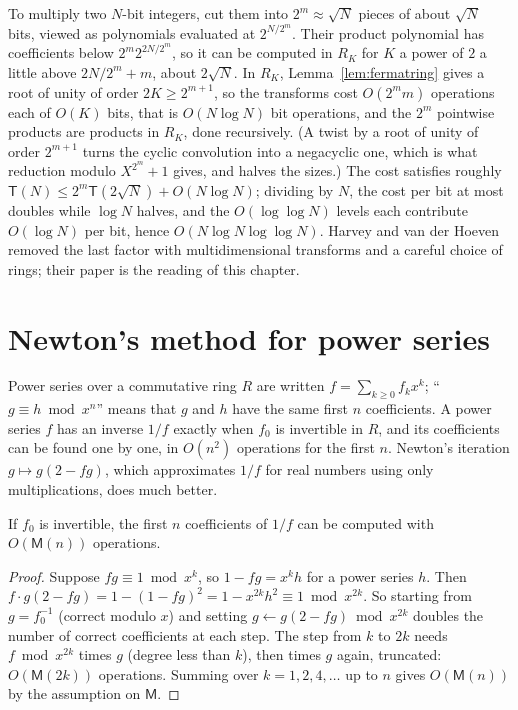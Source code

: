 \begin{remark}
To multiply two $N$-bit integers, cut them into $2^m\approx\sqrt N$ pieces of about $\sqrt N$ bits, viewed as polynomials evaluated at $2^{N/2^m}$. Their product polynomial has coefficients below $2^m2^{2N/2^m}$, so it can be computed in $R_K$ for $K$ a power of $2$ a little above $2N/2^m+m$, about $2\sqrt N$. In $R_K$, Lemma~\ref{lem:fermatring} gives a root of unity of
order $2K\ge2^{m+1}$, so the transforms cost $O(2^mm)$ operations each of $O(K)$ bits, that is $O(N\log N)$ bit operations, and the $2^m$ pointwise products are products in $R_K$, done recursively. (A twist by a root of unity of order $2^{m+1}$ turns the cyclic convolution into a negacyclic one, which is what reduction modulo $X^{2^m}+1$ gives, and halves the sizes.) The cost satisfies roughly
$\mathsf T(N)\le2^m\mathsf T(2\sqrt N)+O(N\log N)$; dividing by $N$, the cost per bit at most doubles while $\log N$ halves, and the $O(\log\log N)$ levels each contribute $O(\log N)$ per bit, hence $O(N\log N\log\log N)$. Harvey and van der Hoeven removed the last factor with multidimensional transforms and a careful choice of rings; their paper is the reading of this chapter.
\end{remark}

\section{Newton's method for power series}\label{sec:newton}

Power series over a commutative ring $R$ are written $f=\sum_{k\ge0}f_kx^k$; ``$g\equiv h\bmod x^n$'' means that $g$ and $h$ have the same first $n$ coefficients. A power series $f$ has an inverse $1/f$ exactly when $f_0$ is invertible in $R$, and its coefficients can be found one by one, in $O(n^2)$ operations for the first $n$. Newton's
iteration $g\mapsto g(2-fg)$, which approximates $1/f$ for real numbers using only multiplications, does much better.

\begin{theorem}\label{thm:newtoninverse}
If $f_0$ is invertible, the first $n$ coefficients of $1/f$ can be computed with $O(\mathsf M(n))$ operations.
\end{theorem}
\begin{proof}
Suppose $fg\equiv1\bmod x^k$, so $1-fg=x^kh$ for a power series $h$. Then $f\cdot g(2-fg)=1-(1-fg)^2=1-x^{2k}h^2\equiv1\bmod x^{2k}$. So starting from $g=f_0^{-1}$ (correct modulo $x$) and setting $g\leftarrow g(2-fg)\bmod x^{2k}$ doubles the number of correct coefficients at each step. The step from $k$ to $2k$ needs $f\bmod x^{2k}$ times $g$ (degree less than $k$), then
times $g$ again, truncated: $O(\mathsf M(2k))$ operations. Summing over $k=1,2,4,\dots$ up to $n$ gives $O(\mathsf M(n))$ by the assumption on $\mathsf M$.
\end{proof}

